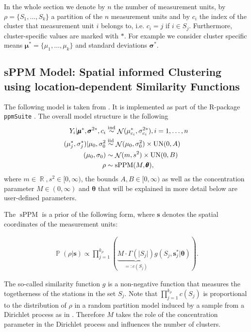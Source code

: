 \documentclass[12pt,a4paper]{article}
\DeclareMathOperator{\Normal}{\mathcal{N}}
\DeclareMathOperator{\sPPM}{\mathrm{sPPM}}
\DeclareMathOperator{\Uniform}{\mathrm{UN}}
\DeclareMathOperator{\RR}{\mathbb{R}}
\DeclareMathOperator{\PP}{\mathbb{P}}
\begin{document}
In the whole section we denote by $n$ the number of measurement units, by $\rho = \{ S_1, \dots, S_k \}$  a partition of the $n$ measurement units and by $c_i$ the index of the cluster that measurement unit $i$ belongs to, i.e. $c_i = j$ if $i \in S_j$. Furthermore, cluster-specific values are marked with $*$. For example we consider cluster specific means $\pmb{\mu}^* = \{ \mu_1, \dots, \mu_k \}$ and standard deviations $\pmb{\sigma}^{*}$.

\subsection{sPPM Model: Spatial informed Clustering using location-dependent Similarity 
Functions} \label{subsec:sPPM-model}

The following model is taken from \cite{Page2016-Spatial}. It is implemented as part of the R-package \texttt{ppmSuite} \cite{ppmSuite}.
The overall model structure is the following
\begin{align*}
    Y_i | \pmb{\mu}^*, \pmb{\sigma}^{2*}, c_i &\overset{\tiny{\mathrm{ind}}}{\sim} \Normal (\mu_{c_i}^*, \sigma_{c_i}^{2*}), i = 1, \dots, n \\
    (\mu_j^*, \sigma_j^*)  | \mu_0, \sigma_0^2 &\overset{\tiny{\mathrm{iid}}}{\sim} \Normal ( \mu_0, \sigma_0^2) \times \Uniform (0,A)\\
    (\mu_0, \sigma_0) &\sim \Normal (m, s^2) \times \Uniform (0,B)\\
    \rho &\sim \sPPM(M, \pmb{\theta}),
\end{align*}
where $m \in \RR, s^2 \in [0, \infty )$, the bounds $A, B \in [0, \infty)$ as well as the concentration parameter $M \in (0, \infty)$ and $\mathbf{\theta}$ that will be explained in more detail below are user-defined parameters.

The $\sPPM$ is a prior of the following form, where $\mathbf{s}$ denotes the spatial coordinates of the measurement units:

\begin{align} \label{sPPM-prior}
    \PP(\rho | \pmb{s} ) \propto \prod_{j=1}^{k_{\rho}} \left( \underbrace{M \cdot \Gamma(\vert S_j \vert) }_{=:c(S_j)}g(S_j, \pmb{s}^*_j \vert \pmb{\theta}) \right) .
\end{align}

The so-called similarity function $g$ is a non-negative function that measures the togetherness of the stations in the set $S_j$.
Note that $\prod_{j=1}^{k_{\rho}} c(S_j) $ is proportional to the distribution of $\rho$ in a random partition model induced by a sample from a Dirichlet process as in \cite[Section 8.1.3]{lecturenotes}. Therefore $M$ takes the role of the concentration parameter in the Dirichlet process and influences the number of clusters.
\end{document}
